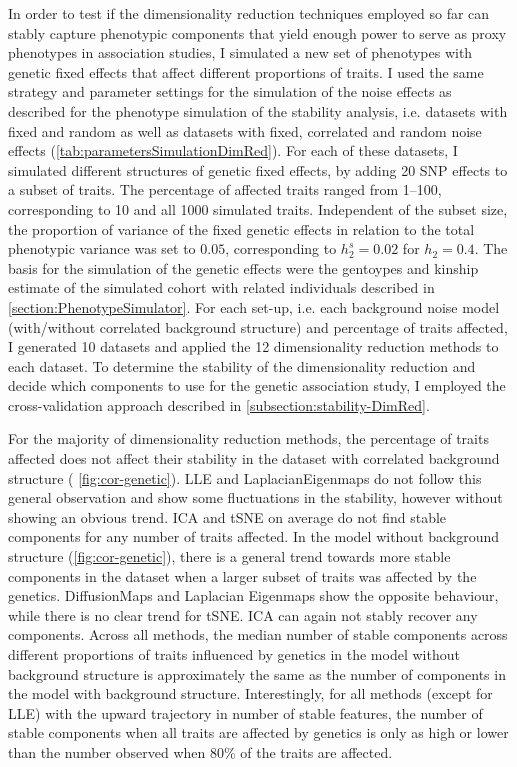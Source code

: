 In order to test if the dimensionality reduction techniques employed so far can stably capture phenotypic components that yield enough power to serve as proxy phenotypes in association studies, I simulated a new set of phenotypes with genetic fixed effects that affect different proportions of traits. I used the same strategy and parameter settings for the simulation of the noise effects as described for the phenotype simulation of the stability analysis, i.e. datasets with fixed and random as well as datasets with fixed, correlated and random noise effects (\cref{tab:parametersSimulationDimRed}). For each of these datasets, I simulated different structures of genetic fixed effects, by adding \num{20} SNP effects to a subset of traits.  The percentage of affected traits ranged from \numrange{1}{100}, corresponding to \num{10} and all \num{1000} simulated traits. Independent of the subset size, the proportion of variance of the fixed genetic effects in relation to the total phenotypic variance was set to \(0.05\), corresponding to \(h^s_2=0.02\) for \(h_2=0.4\). The basis for the simulation of the genetic effects were the gentoypes and kinship estimate of the simulated cohort with related individuals described in \cref{section:PhenotypeSimulator}.  For each set-up, i.e. each background noise model (with/without correlated background structure) and percentage of traits affected, I generated \num{10} datasets and applied the \num{12} dimensionality reduction methods to each dataset. To determine the stability of the dimensionality reduction and decide which components to use for the genetic association study, I employed the cross-validation approach described in \cref{subsection:stability-DimRed}. 

For the majority of dimensionality reduction methods, the percentage of traits affected does not affect their stability in the dataset with correlated background structure ( \cref{fig:cor-genetic}). LLE and LaplacianEigenmaps do not follow this general observation and show some fluctuations in the stability, however without showing an obvious trend.  ICA and tSNE on average do not find stable components for any number of traits affected. In the model without background structure (\cref{fig:cor-genetic}), there is a general trend towards more stable components in the dataset when a larger subset of traits was affected by the genetics. DiffusionMaps and Laplacian Eigenmaps show the opposite behaviour, while there is no clear trend for tSNE. ICA can again not stably recover any components. Across all methods, the median number of stable components across different proportions of traits influenced by genetics in the model without background structure is approximately the same as the number of components in the model with background structure. Interestingly, for all methods (except for LLE) with the upward trajectory in number of stable features, the number of stable components when all traits are affected by genetics is only as high or lower than the number observed when \num{80}\% of the traits are affected. 

